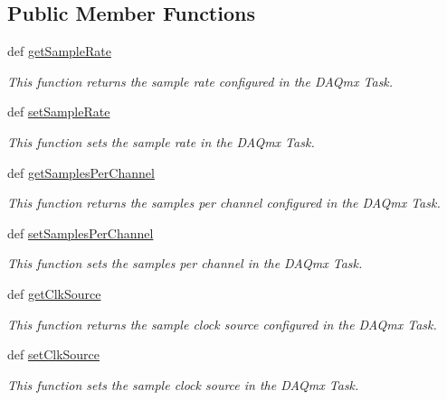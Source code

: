 \subsection*{Public Member Functions}
\begin{DoxyCompactItemize}
\item 
def \hyperlink{class_digital_output_1_1_digital_output_a0c8ab0946897540122502804d4b1a0eb}{get\-Sample\-Rate}
\begin{DoxyCompactList}\small\item\em This function returns the sample rate configured in the D\-A\-Qmx Task. \end{DoxyCompactList}\item 
def \hyperlink{class_digital_output_1_1_digital_output_a96ff9f9cb2f61ec977e9c6df2b525499}{set\-Sample\-Rate}
\begin{DoxyCompactList}\small\item\em This function sets the sample rate in the D\-A\-Qmx Task. \end{DoxyCompactList}\item 
def \hyperlink{class_digital_output_1_1_digital_output_aeef526fd09b2d6cc25c034a01bf16b0e}{get\-Samples\-Per\-Channel}
\begin{DoxyCompactList}\small\item\em This function returns the samples per channel configured in the D\-A\-Qmx Task. \end{DoxyCompactList}\item 
def \hyperlink{class_digital_output_1_1_digital_output_a7866f0194c502d7d99130513aafddb51}{set\-Samples\-Per\-Channel}
\begin{DoxyCompactList}\small\item\em This function sets the samples per channel in the D\-A\-Qmx Task. \end{DoxyCompactList}\item 
def \hyperlink{class_digital_output_1_1_digital_output_ac1122c27d8cacd4f4d7f3068d0613635}{get\-Clk\-Source}
\begin{DoxyCompactList}\small\item\em This function returns the sample clock source configured in the D\-A\-Qmx Task. \end{DoxyCompactList}\item 
def \hyperlink{class_digital_output_1_1_digital_output_a467edd75df46b381036ce37ca665e047}{set\-Clk\-Source}
\begin{DoxyCompactList}\small\item\em This function sets the sample clock source in the D\-A\-Qmx Task. \end{DoxyCompactList}\item 

\end{DoxyCompactItemize}
